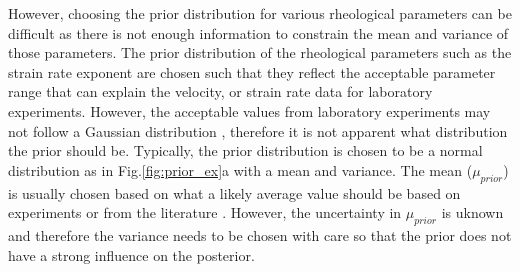 \documentclass[12pt]{article}
\begin{document}
However, choosing the prior distribution for various rheological parameters can be difficult as there is not enough information to constrain the mean and variance of those parameters. The prior distribution of the rheological parameters such as the strain rate exponent are chosen such that they reflect the acceptable parameter range that can explain the velocity, or strain rate data for laboratory experiments. However, the acceptable values from laboratory experiments may not follow a Gaussian distribution \citep{korenaga2008new}, therefore it is not apparent what distribution the prior should be.  Typically, the prior distribution is chosen to be a normal distribution as in Fig.\ref{fig:prior_ex}a 
 with a mean and variance. The mean ($\mu_{prior}$) is usually chosen based on what a likely average value should be based on experiments or from  the literature \citep{korenaga2008new}. However, the uncertainty in $\mu_{prior}$ is uknown and therefore the variance needs to be chosen with care so that the prior does not have a strong influence on the posterior.    %
\end{document}
